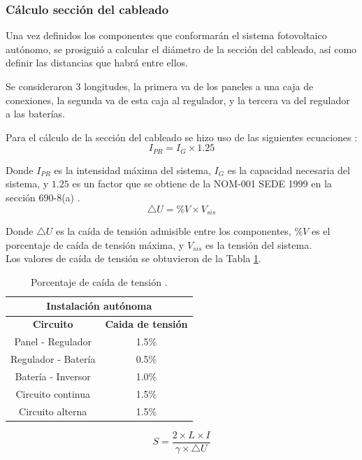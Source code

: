 \subsubsection{Cálculo sección del cableado}

Una vez definidos los componentes que conformarán el sistema fotovoltaico autónomo, se prosiguió a calcular el diámetro de la sección del cableado, así como definir las distancias que habrá entre ellos.

Se consideraron 3 longitudes, la primera va de los paneles a una caja de conexiones, la segunda va de esta caja al regulador, y la tercera va del regulador a las baterías. 
 
Para el cálculo de la sección del cableado se hizo uso de las siguientes ecuaciones \cite{DDE7}:
\begin{equation}\label{eq:ecu29}
I_{PR} = I_{G} \times 1.25
\end{equation}
 
Donde $I_{PR}$ es la intensidad máxima del sistema, $I_{G}$ es la capacidad necesaria del sistema, y $1.25$ es un factor que se obtiene de la NOM-001 SEDE 1999 en la sección 690-8(a) \cite{DDE6}.\\

\begin{equation}\label{eq:ecu30}
\bigtriangleup U = \% V \times V_{sis}
\end{equation}

Donde $\bigtriangleup U$ es la caída de tensión admisible entre los componentes, $\% V$ es el porcentaje de caída de tensión máxima, y $V_{sis}$ es la tensión del sistema.\\

Los valores de caída de tensión se obtuvieron de la Tabla \ref{tab:1}.

\begin{table}[H]
	\centering
	\caption{Porcentaje de caída de tensión \cite{DDE7}.}
	\begin{tabular}{|c|c|}
		\hline
		\multicolumn{2}{|p{17.215em}|}{\textbf{Instalación autónoma}} \\
		\hline
		\textbf{Circuito} & \multicolumn{1}{p{9.5em}|}{\textbf{Caida de tensión}} \\
		\hline
		Panel - Regulador & 1.5\% \\
		\hline
		Regulador - Batería & 0.5\% \\
		\hline
		Batería - Inversor & 1.0\% \\
		\hline
		Circuito continua & 1.5\% \\
		\hline
		Circuito alterna & 1.5\% \\
		\hline
	\end{tabular}%
	\label{tab:1}%
\end{table}%
\begin{equation}\label{eq:ecu31}
S = \frac{2 \times L \times I}{\gamma \times \bigtriangleup U}
\end{equation}

